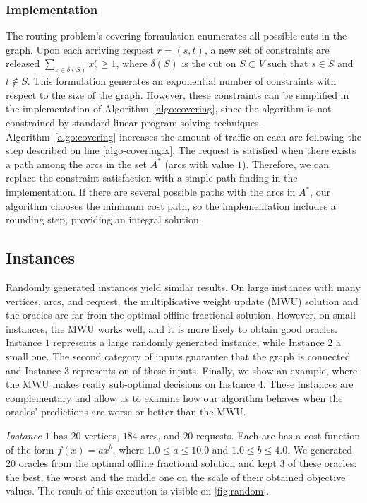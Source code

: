 \subsubsection{Implementation}
The routing problem's covering formulation enumerates all possible cuts in the graph. Upon each arriving request $r = (s,t)$, a new set of constraints are released $\sum_{e \in \delta(S)} x_{e}^{r} \ge 1$, where $\delta(S)$ is the cut on $S \subset V$ such that $s \in S$ and $t \notin S$. This formulation generates an exponential number of constraints with respect to the size of the graph. However, these constraints can be simplified in the implementation of Algorithm~\ref{algo:covering}, since the algorithm is not constrained by standard linear program solving techniques. Algorithm~\ref{algo:covering} increases the amount of traffic on each arc following the step described on line \ref{algo-covering:x}. The request is satisfied when there exists a path among the arcs in the set $A^{*}$ (arcs with value $1$). Therefore, we can replace the constraint satisfaction with a simple path finding in the implementation. If there are several possible paths with the arcs in $A^{*}$, our algorithm chooses the minimum cost path, so the implementation includes a rounding step, providing an integral solution.


\subsection{Instances} Randomly generated instances yield similar results. On large instances with many vertices, arcs, and request, the multiplicative weight update (MWU) solution and the oracles are far from the optimal offline fractional solution. However, on small instances, the MWU works well, and it is more likely to obtain good oracles. Instance $1$ represents a large randomly generated instance, while Instance $2$ a small one. The second category of inputs guarantee that the graph is connected and Instance $3$ represents on of these inputs. Finally, we show an example, where the MWU makes really sub-optimal decisions on Instance $4$. These instances are complementary and allow us to examine how our algorithm behaves when the oracles' predictions are worse or better than the MWU.

\textit{Instance $1$} has $20$ vertices, $184$ arcs, and $20$ requests. Each arc has a cost function of the form $f(x) = a x^b$, where $1.0 \le a \le 10.0$ and $1.0 \le b \le 4.0$. We generated $20$ oracles from the optimal offline fractional solution and kept $3$ of these oracles: the best, the worst and the middle one on the scale of their obtained objective values. The result of this execution is visible on \cref{fig:random}.

